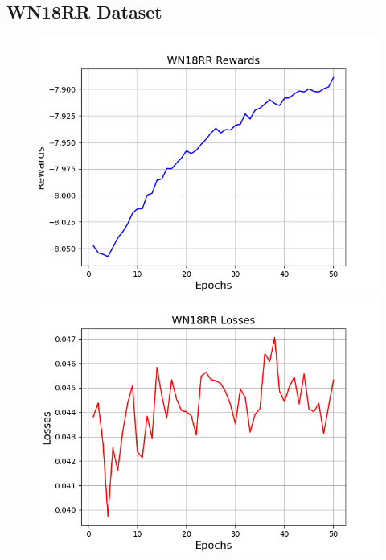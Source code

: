 \subsection{WN18RR Dataset}
\begin{figure}
    \centering
    \begin{minipage}{.5\textwidth}
      \centering
      \includegraphics[width=0.9\linewidth]{appendices/wn18rr/gan_train_wn18rr_rewards.png}
    \end{minipage}%
    \begin{minipage}{.5\textwidth}
      \centering
      \includegraphics[width=0.9\linewidth]{appendices/wn18rr/gan_train_wn18rr_losses.png}
    \end{minipage}
    \begin{minipage}{.5\textwidth}
      \centering

\end{minipage}
\end{figure}
